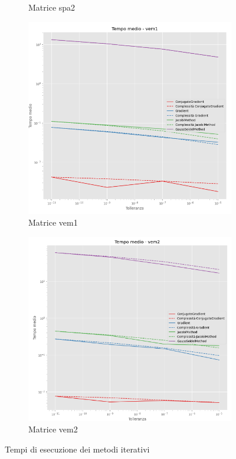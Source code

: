 \begin{figure}[!ht]
\begin{subfigure}{0.45\textwidth}
        \caption{Matrice spa2}
        \label{fig:time_spa2}
    \end{subfigure}
    \hfill
    \begin{subfigure}{0.45\textwidth}
        \centering
        \includegraphics[width=\textwidth]{./../report/Progetto_1_bis/img/time_vem1.png}
        \caption{Matrice vem1}
        \label{fig:time_vem1}
    \end{subfigure}
    \hfill
    \begin{subfigure}{0.45\textwidth}
        \centering
        \includegraphics[width=\textwidth]{./../report/Progetto_1_bis/img/time_vem2.png}
        \caption{Matrice vem2}
        \label{fig:time_vem2}
    \end{subfigure}
    \caption{Tempi di esecuzione dei metodi iterativi}
    \label{fig:time}
\end{figure}

